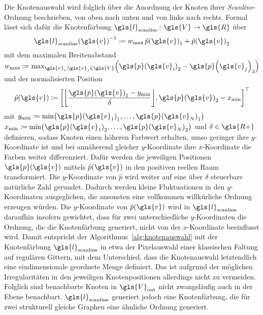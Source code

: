 Die Knotenauswahl wird folglich über die Anordnung der Knoten \bzgl{} ihrer \emph{Scanline}-Ordnung beschrieben, \dhe{} von oben nach unten und von links nach rechts.
Formal lässt sich dafür die Knotenfärbung $\gls{l}_{\mathrm{scanline}} \colon \gls{V} \to \gls{R}$ über
\begin{equation*}
  {\gls{l}_{\mathrm{scanline}}\left(\gls{v}\right)}^{-1} \coloneqq w_{\max} \, {\hat p\left(\gls{v}\right)}_1 + {\hat p\left(\gls{v}\right)}_2
\end{equation*}
mit dem maximalen Breitenabstand $w_{\max} \coloneqq \max_{\gls{v}_i, \gls{v}_j \in \gls{V}} \left({\gls{p}\left(\gls{v}_i\right)}_2 - {\gls{p}\left(\gls{v}_j\right)}_2 \right)$ und der normalisierten Position
\begin{equation*}
  \hat p\left(\gls{v}\right) \coloneqq {\left[\left\lfloor\frac{{\gls{p}\left(\gls{v}\right)}_1 - y_{\min}}{\delta} \right\rfloor, {\gls{p}\left(\gls{v}\right)}_2 - x_{\min}\right]}^{\top}
\end{equation*}
mit $y_{\min} \coloneqq \min \left({\gls{p}\left(\gls{v}_1\right)}_1, \ldots, {\gls{p}\left(\gls{v}_N\right)}_1\right)$ \bzw{} $x_{\min} \coloneqq \min \left({\gls{p}\left(\gls{v}_1\right)}_2, \ldots, {\gls{p}\left(\gls{v}_N\right)}_2\right)$ und $\delta \in \gls{R+}$ definieren, sodass Knoten einen höheren Farbwert erhalten, umso geringer ihre $y$-Koordinate ist und bei annäherend gleicher $y$-Koordinate ihre $x$-Koordinate die Farben weiter differenziert.
Dafür werden die jeweiligen Positionen $\gls{p}\left(\gls{v}\right)$ mittels $\hat p\left(\gls{v}\right)$ in den positiven reellen Raum transformiert.
Die $y$-Koordinate von $\hat p$ wird weiter auf eine über $\delta$ steuerbare natürliche Zahl gerundet.
Dadurch werden kleine Fluktuationen in den $y$-Koordinaten ausgeglichen, die ansonsten eine vollkommen willkürliche Ordnung erzeugen würden.
Die $y$-Koordinate von $\hat p\left(\gls{v}\right)$ wird in $\gls{l}_{\mathrm{scanline}}$ daraufhin insofern gewichtet, dass für zwei unterschiedliche $y$-Koordinaten die Ordnung, die die Knotenfärbung generiert, nicht von der $x$-Koordinate beeinflusst wird.
Damit entspricht der Algorithmus~\ref{alg:knotenauswahl} mit der Knotenfärbung $\gls{l}_{\mathrm{scanline}}$ in etwa der Pixelauswahl einer klassischen Faltung auf regulären Gittern, mit dem Unterschied, dass die Knotenauswahl letztendlich eine eindimensionale geordnete Menge definiert.
Das ist aufgrund der möglichen Irregularitäten in den jeweiligen Knotenpositionen allerdings nicht zu vermeiden.
Folglich sind benachbarte Knoten in $\gls{V}_{\mathrm{out}}$ nicht zwangsläufig auch in der Ebene benachbart.
$\gls{l}_{\mathrm{scanline}}$ generiert jedoch eine Knotenfärbung, die für zwei strukturell gleiche Graphen eine ähnliche Ordnung generiert.

